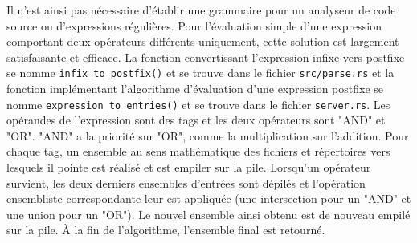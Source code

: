 \bigbreak
Il n'est ainsi pas nécessaire d'établir une grammaire pour un analyseur de code source ou d'expressions 
régulières. Pour l'évaluation simple d'une expression comportant deux opérateurs différents uniquement, 
cette solution est largement satisfaisante et efficace. La fonction convertissant l'expression 
infixe vers postfixe se nomme \texttt{infix_to_postfix()} et se trouve dans le fichier 
\texttt{src/parse.rs} et la fonction implémentant l'algorithme d'évaluation d'une 
expression postfixe se nomme \texttt{expression_to_entries()} et se trouve dans le fichier 
\texttt{server.rs}. Les opérandes de l'expression sont des tags et les deux opérateurs sont 
"AND" et "OR". "AND" a la priorité sur "OR", comme la multiplication sur l'addition. Pour chaque tag, 
un ensemble au sens mathématique des fichiers et répertoires vers lesquels il pointe est réalisé et 
est empiler sur la pile. Lorsqu'un opérateur survient, les deux derniers ensembles d'entrées sont 
dépilés et l'opération ensembliste correspondante leur est appliquée (une intersection pour un "AND" 
et une union pour un "OR"). Le nouvel ensemble ainsi obtenu est de nouveau empilé sur la pile. 
À la fin de l'algorithme, l'ensemble final est retourné.


